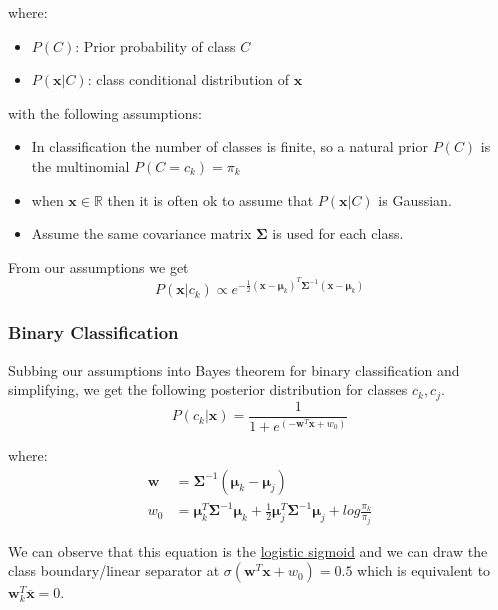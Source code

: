\documentclass[12pt]{article}
\begin{document}
        where:
        \begin{itemize}
            \item $P(C)$: Prior probability of class $C$
            \item $P(\boldsymbol{x}|C)$: class conditional distribution of $\boldsymbol{x}$
        \end{itemize}

        with the following assumptions:
        \begin{itemize}
            \item In classification the number of classes is finite, so a natural prior $P(C)$ is the multinomial $P(C = c_k) = \pi_k$
            \item when $\boldsymbol{x} \in \mathbb{R}$ then it is often ok to assume that $P(\boldsymbol{x}|C)$ is Gaussian.
            \item Assume the same covariance matrix $\boldsymbol{\Sigma}$ is used for each class.
        \end{itemize}

        From our assumptions we get
        $$P(\boldsymbol{x}|c_k) \propto e^{-\frac{1}{2}(\boldsymbol{x} - \boldsymbol{\mu}_k)^T \boldsymbol{\Sigma}^{-1}(\boldsymbol{x} - \boldsymbol{\mu}_k)} $$


        \subsubsection{Binary Classification}
        Subbing our assumptions into Bayes theorem for binary classification and simplifying, we get the following posterior distribution for classes $c_k, c_j$.
        $$ P(c_k|\boldsymbol{x}) = \frac{1}{1+e^{(-\boldsymbol{w}^T\boldsymbol{x} + w_0)}} $$

        where:
        \begin{align*}
            \boldsymbol{w} &= \boldsymbol{\Sigma}^{-1}(\boldsymbol{\mu}_k - \boldsymbol{\mu}_j) \\
            w_0 &= \boldsymbol{\mu}^T_k \boldsymbol{\Sigma}^{-1}\boldsymbol{\mu}_k + \frac{1}{2}\boldsymbol{\mu}^T_j\boldsymbol{\Sigma}^{-1}\boldsymbol{\mu}_j + log\frac{\pi_k}{\pi_j}
        \end{align*}

        We can observe that this equation is the \hyperlink{Sigmoid Function}{logistic sigmoid} and we can draw the class boundary/linear separator at $\sigma(\boldsymbol{w}^T\boldsymbol{x} + w_0) = 0.5$ which is equivalent to $\boldsymbol{w}^T_k \overline{\boldsymbol{x}} = 0$.
        
\end{document}
